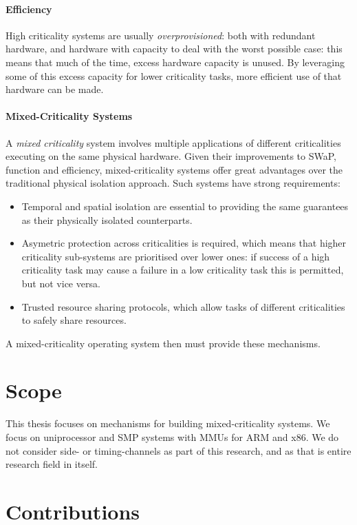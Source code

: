 \paragraph{Efficiency}

High criticality systems are usually \emph{overprovisioned}: both with redundant hardware, and hardware with capacity to deal with the worst possible case: this means that much of the time, excess hardware capacity is unused. 
By leveraging some of this excess capacity for lower criticality tasks, more efficient use of that hardware can be made.

\paragraph{Mixed-Criticality Systems}

A \emph{mixed criticality} system involves multiple applications of different criticalities executing on the same physical hardware. 
Given their improvements to \gls{SWaP}, function and efficiency, mixed-criticality systems offer great advantages over the traditional physical isolation approach. 
Such systems have strong requirements:

\begin{itemize}
\item Temporal and spatial isolation are essential to providing the same guarantees as their physically isolated counterparts.
\item Asymetric protection across criticalities is required, which means that higher criticality sub-systems are prioritised over lower ones: if success of a high criticality task may cause a failure in a low criticality task this is permitted, but not vice versa.
\item Trusted resource sharing protocols, which allow tasks of different criticalities to safely share resources.
\end{itemize}

A mixed-criticality operating system then must provide these mechanisms. 


\section{Scope}

This thesis focuses on mechanisms for building mixed-criticality systems. 
We focus on uniprocessor and \gls{SMP} systems with \glspl{MMU} for ARM and x86.
We do not consider side- or timing-channels as part of this research, and as that is entire research field in itself.

\section{Contributions}






